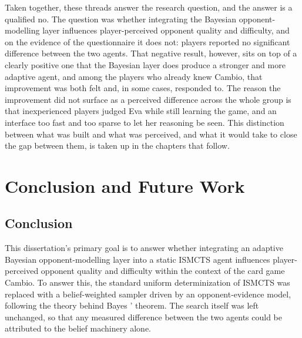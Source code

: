\documentclass[12pt,a4paper,oneside]{report}
\begin{document}
Taken together, these threads answer the research question, and the answer is a qualified no. The question was whether integrating the Bayesian opponent-modelling layer influences player-perceived opponent quality and difficulty, and on the evidence of the questionnaire it does not: players reported no significant difference between the two agents. That negative result, however, sits on top of a clearly positive one that the Bayesian layer does produce a stronger and more adaptive agent, and among the players who already knew Cambio, that improvement was both felt and, in some cases, responded to. The reason the improvement did not surface as a perceived difference across the whole group is that inexperienced players judged Eva while still learning the game, and an interface too fast and too sparse to let her reasoning be seen. This distinction between what was built and what was perceived, and what it would take to close the gap between them, is taken up in the chapters that follow.

\chapter{Conclusion and Future Work}\label{chap:conclusion}
\section{Conclusion}

This dissertation’s primary goal is to answer whether integrating an adaptive Bayesian
opponent-modelling layer into a static ISMCTS agent influences player-perceived
opponent quality and difficulty within the context of the card game Cambio. To answer this, the standard
uniform determinization of ISMCTS was replaced with a belief-weighted sampler driven by
an opponent-evidence model, following the theory behind Bayes ' theorem. The search itself was left unchanged, so that any measured difference between the two
agents could be attributed to the belief machinery alone.
\end{document}
